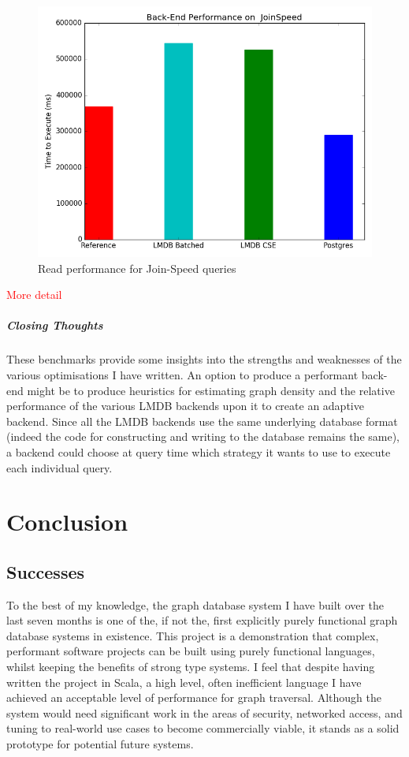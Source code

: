 \documentclass[12pt,a4paper,twoside,openright]{report}
\newcommand\todo[1]{\textcolor{red}{#1}}
\begin{document}
\begin{figure}[ht]
\centering
  \includegraphics[width=\textwidth]{scripts/JoinSpeed.png}
  \caption{Read performance for Join-Speed queries}
  \label{fig:JoinSpeedResults}
\end{figure}
						\todo{More detail}
			\paragraph{Closing Thoughts}
			These benchmarks provide some insights into the strengths and weaknesses of the various optimisations I have written. An option to produce a performant back-end might be to produce heuristics for estimating graph density and the relative performance of the various LMDB backends upon it to create an adaptive backend. Since all the LMDB backends use the same underlying database format (indeed the code for constructing and writing to the database remains the same), a backend could choose at query time which strategy it wants to use to execute each individual query.


	
\chapter{Conclusion}

\section{Successes}
To the best of my knowledge, the graph database system I have built over the last seven months is one of the, if not the, first explicitly purely functional graph database systems in existence. This project is a demonstration that complex, performant software projects can be built using purely functional languages, whilst keeping the benefits of strong type systems. I feel that despite having written the project in Scala, a high level, often inefficient language I have achieved an acceptable level of performance for graph traversal. Although the system would need significant work in the areas of security, networked access, and tuning to real-world use cases to become commercially viable, it stands as a solid prototype for potential future systems.
\end{document}
